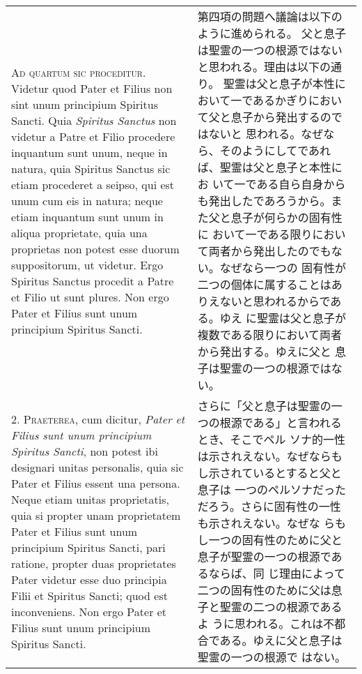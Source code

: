 \documentclass[10pt]{jsarticle} %
\begin{document}
\begin{longtable}{p{21em}p{21em}}

{\scshape Ad quartum sic proceditur}. Videtur quod Pater et Filius non sint unum
principium  Spiritus Sancti. Quia {\itshape  Spiritus Sanctus} non
videtur a Patre et Filio procedere inquantum sunt unum, neque in
natura, quia Spiritus Sanctus sic etiam procederet a
seipso, qui est unum cum eis in natura; neque etiam inquantum sunt
unum in aliqua proprietate, quia una proprietas non potest esse duorum
suppositorum, ut videtur. Ergo Spiritus Sanctus procedit a
Patre et Filio ut sunt plures. Non ergo Pater et Filius sunt unum
principium  Spiritus Sancti.

&

第四項の問題へ議論は以下のように進められる。
父と息子は聖霊の一つの根源ではないと思われる。理由は以下の通り。
聖霊は父と息子が本性において一であるかぎりにおいて父と息子から発出するのではないと
 思われる。なぜなら、そのようにしてであれば、聖霊は父と息子と本性にお
 いて一である自ら自身からも発出したであろうから。また父と息子が何らかの固有性に
 おいて一である限りにおいて両者から発出したのでもない。なぜなら一つの
 固有性が二つの個体に属することはありえないと思われるからである。ゆえ
 に聖霊は父と息子が複数である限りにおいて両者から発出する。ゆえに父と
 息子は聖霊の一つの根源ではない。

\\



2. {\scshape Praeterea}, cum dicitur, {\itshape Pater et Filius sunt unum principium  Spiritus
Sancti}, non potest ibi designari unitas personalis, quia sic Pater et
Filius essent una persona. Neque etiam unitas proprietatis, quia si
propter unam proprietatem Pater et Filius sunt unum principium
Spiritus Sancti, pari ratione, propter duas proprietates Pater videtur
esse duo principia Filii et  Spiritus Sancti; quod est
inconveniens. Non ergo Pater et Filius sunt unum principium  Spiritus
Sancti.

&

さらに「父と息子は聖霊の一つの根源である」と言われるとき、そこでペル
 ソナ的一性は示されえない。なぜならもし示されているとすると父と息子は
 一つのペルソナだっただろう。さらに固有性の一性も示されえない。なぜな
 らもし一つの固有性のために父と息子が聖霊の一つの根源であるならば、同
 じ理由によって二つの固有性のために父は息子と聖霊の二つの根源であるよ
 うに思われる。これは不都合である。ゆえに父と息子は聖霊の一つの根源で
 はない。

\\




\end{longtable}
\end{document}
